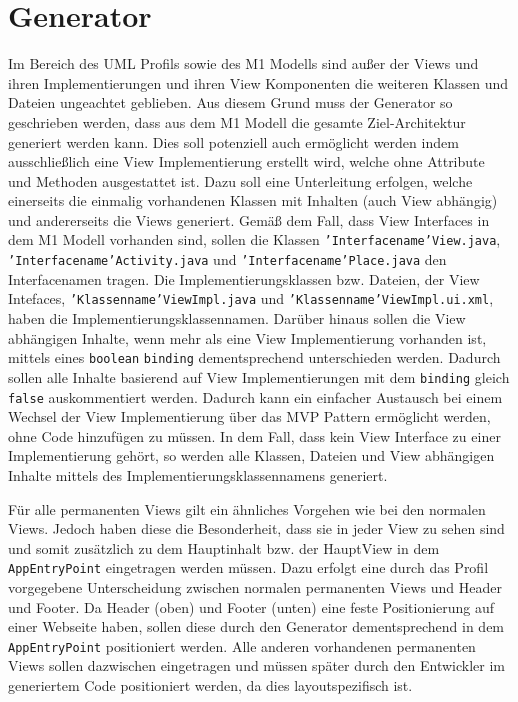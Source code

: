 \section{Generator}\label{AufBGenerator}
Im Bereich des UML Profils sowie des M1 Modells sind außer der Views und ihren
Implementierungen und ihren View Komponenten die weiteren Klassen und Dateien
ungeachtet geblieben. Aus diesem Grund muss der Generator so geschrieben werden,
dass aus dem M1 Modell die gesamte Ziel-Architektur generiert werden kann.
Dies soll potenziell auch ermöglicht werden indem ausschließlich eine View
Implementierung erstellt wird, welche ohne Attribute und Methoden ausgestattet ist. Dazu soll
eine Unterleitung erfolgen, welche einerseits die einmalig vorhandenen Klassen
mit Inhalten (auch View abhängig) und andererseits die Views
generiert. Gemäß dem Fall, dass View Interfaces in dem M1 Modell vorhanden sind,
sollen die Klassen \texttt{'Interfacename'View.java},
\texttt{'Interfacename'Activity.java} und \texttt{'Interfacename'Place.java} den Interfacenamen tragen. Die
Implementierungsklassen bzw. Dateien, der View Intefaces,
\texttt{'Klassenname'ViewImpl.java} und \texttt{'Klassenname'ViewImpl.ui.xml}, haben die
Implementierungsklassennamen. Darüber hinaus sollen die View abhängigen Inhalte,
wenn mehr als eine View Implementierung vorhanden ist, mittels eines
\texttt{boolean} \texttt{binding} dementsprechend unterschieden werden. Dadurch
sollen alle Inhalte basierend auf View Implementierungen mit dem
\texttt{binding} gleich \texttt{false} auskommentiert werden.
Dadurch kann ein einfacher Austausch bei einem Wechsel der View Implementierung
über das MVP Pattern ermöglicht werden, ohne Code hinzufügen zu müssen.
In dem Fall, dass kein View Interface zu einer Implementierung gehört, so werden
alle Klassen, Dateien und View abhängigen Inhalte mittels des
Implementierungsklassennamens generiert.

Für alle permanenten Views gilt ein
ähnliches Vorgehen wie bei den normalen Views. Jedoch haben diese die
Besonderheit, dass sie in jeder View zu sehen sind und somit zusätzlich zu dem
Hauptinhalt bzw. der HauptView in dem \texttt{AppEntryPoint} eingetragen
werden müssen. Dazu erfolgt eine durch das Profil vorgegebene Unterscheidung
zwischen normalen permanenten Views und Header und Footer. Da Header (oben) und Footer
(unten) eine feste Positionierung auf einer Webseite haben, sollen diese durch
den Generator dementsprechend in dem \texttt{AppEntryPoint} positioniert
werden.
Alle anderen vorhandenen permanenten Views sollen dazwischen eingetragen
und müssen später durch den Entwickler im generiertem Code positioniert werden,
da dies layoutspezifisch ist.

